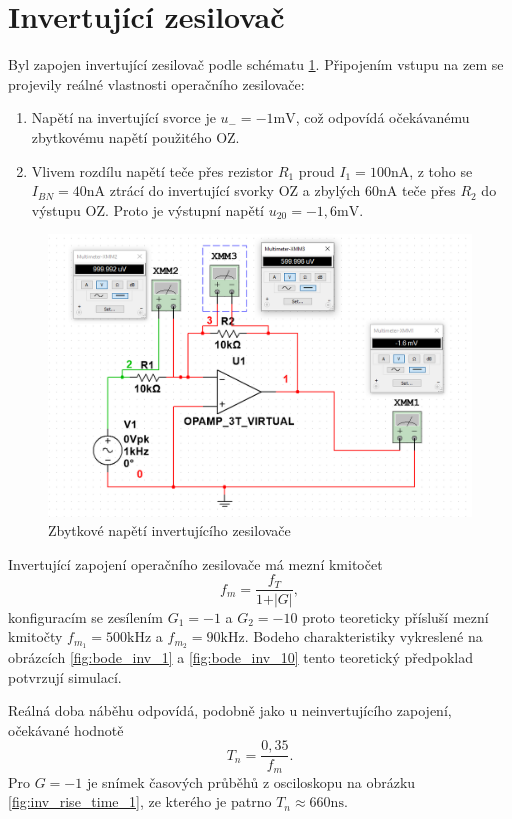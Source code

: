 \documentclass[twoside]{article}
\begin{document}
\section{Invertující zesilovač}

Byl zapojen invertující zesilovač podle schématu \ref{fig:inv_zbytkove}.
Připojením vstupu na zem se projevily reálné vlastnosti operačního zesilovače:
\begin{enumerate}
    \item Napětí na invertující svorce je $u_- = - 1 \si{\milli\volt}$,
    což odpovídá očekávanému zbytkovému napětí použitého OZ.
    \item Vlivem rozdílu napětí teče přes rezistor $R_1$ proud $I_1 = 100 \si{\nano\ampere}$,
    z toho se $I_{BN} = 40 \si{\nano\ampere}$ ztrácí do invertující svorky OZ a zbylých $60 \si{\nano\ampere}$
    teče přes $R_2$ do výstupu OZ. Proto je výstupní napětí $u_{20} = -1,6 \si{\milli\volt}$.
\end{enumerate}

\begin{figure}[h!]
    \centering
    \includegraphics[width=0.7\linewidth]{inv_zbytkove.png}
    \caption{Zbytkové napětí invertujícího zesilovače}
    \label{fig:inv_zbytkove}
\end{figure}

Invertující zapojení operačního zesilovače má mezní kmitočet
\begin{equation}
    f_m = \frac{f_T}{1 + \vert G \vert},
\end{equation}
konfiguracím se zesílením $G_1 = -1$ a $G_2 = -10$ proto teoreticky přísluší mezní kmitočty
$f_{m_1} = 500 \si{\kilo\hertz}$ a $f_{m_2} = 90 \si{\kilo\hertz}$. Bodeho charakteristiky
vykreslené na obrázcích \ref{fig:bode_inv_1} a \ref{fig:bode_inv_10} tento teoretický 
předpoklad potvrzují simulací.

Reálná doba náběhu odpovídá, podobně jako u neinvertujícího zapojení, očekávané hodnotě
\begin{equation}
    T_n = \frac{0,35}{f_m}.
\end{equation}
Pro $G = -1$ je snímek časových průběhů z osciloskopu na obrázku \ref{fig:inv_rise_time_1},
ze kterého je patrno $T_n \approx 660 \si{\nano\second}$.
\end{document}
